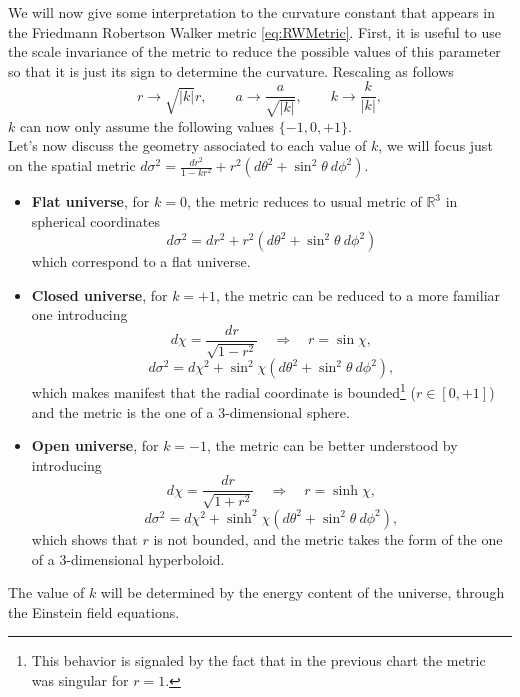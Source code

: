 We will now give some interpretation to the curvature constant that appears in the Friedmann Robertson Walker metric \eqref{eq:RWMetric}. First, it is useful to use the scale invariance of the metric to reduce the possible values of this parameter so that it is just its sign to determine the curvature. Rescaling as follows 
\begin{equation*}
    r\rightarrow\sqrt{|k|}r,\qquad a\rightarrow\frac{a}{\sqrt{|k|}},\qquad k\rightarrow\frac{k}{|k|},
\end{equation*}  
$k$ can now only assume the following values $\{-1,0,+1\}$. \\
Let's now discuss the geometry associated to each value of $k$, we will focus just on the spatial metric $d\sigma^2=\frac{dr^2}{1-kr^2}+r^2(d\theta^2+\sin^2\theta\ d\phi^2)$.
\begin{itemize}
    \item \textbf{Flat universe}, for $k=0$, the metric reduces to usual metric of $\mathbb{R}^3$ in spherical coordinates $$d\sigma^2= dr^2+r^2(d\theta^2+\sin^2\theta\ d\phi^2)$$ which correspond to a flat universe.
    \item \textbf{Closed universe}, for $k=+1$, the metric can be reduced to a more familiar one introducing $$d\chi=\frac{dr}{\sqrt{1-r^2}}\quad\Rightarrow\quad r=\sin\chi,$$$$d\sigma^2=d\chi^2+\sin^2\chi(d\theta^2+\sin^2\theta\ d\phi^2),$$which makes manifest that the radial coordinate is bounded\footnote{This behavior is signaled by the fact that in the previous chart the metric was singular for $r=1$.} ($r\in[0,+1]$) and the metric is the one of a $3$-dimensional sphere.
    \item \textbf{Open universe}, for $k=-1$, the metric can be better understood by introducing$$d\chi=\frac{dr}{\sqrt{1+r^2}}\quad\Rightarrow\quad r=\sinh\chi,$$$$d\sigma^2=d\chi^2+\sinh^2\chi(d\theta^2+\sin^2\theta\ d\phi^2),$$ which shows that $r$ is not bounded, and the metric takes the form of the one of a $3$-dimensional hyperboloid.
\end{itemize}
The value of $k$ will be determined by the energy content of the universe, through the Einstein field equations.

